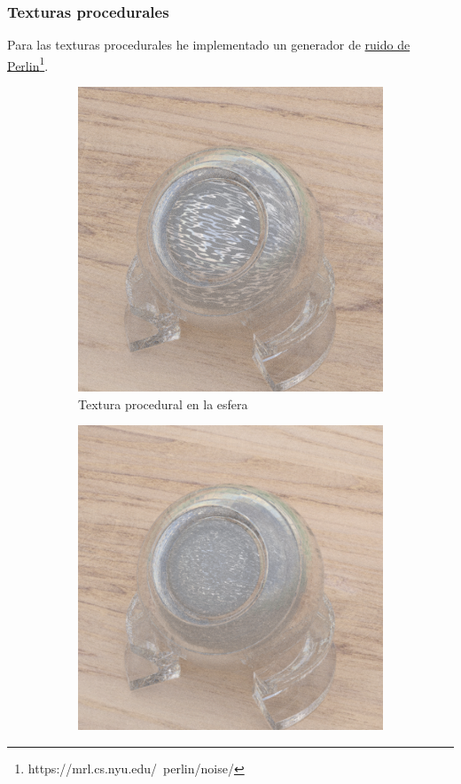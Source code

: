 \documentclass{article}
\begin{document}
\subsubsection{Texturas procedurales}

Para las texturas procedurales he implementado un generador de \href{https://mrl.cs.nyu.edu/~perlin/noise/}{ruido de Perlin}\footnote{https://mrl.cs.nyu.edu/~perlin/noise/}. 

\begin{figure}[H]
  \begin{subfigure}[h]{0.4\linewidth}
    \includegraphics[width=\linewidth]{imgs/orb.png}
    \caption{Textura procedural en la esfera}
  \end{subfigure}
  \hfill
  \begin{subfigure}[h]{0.4\linewidth}
    \includegraphics[width=\linewidth]{imgs/orbm.png}

\end{subfigure}
\end{figure}
\end{document}
